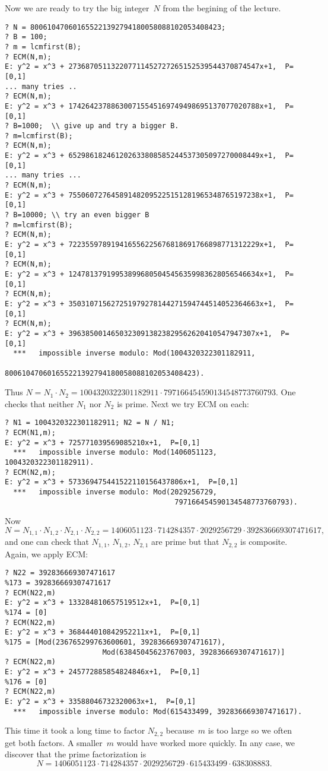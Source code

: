 \documentclass[11pt]{report}
\begin{document}
Now we are ready to try the big integer~$N$ from the begining of the lecture.
\begin{verbatim}
? N = 800610470601655221392794180058088102053408423;
? B = 100;
? m = lcmfirst(B);
? ECM(N,m);
E: y^2 = x^3 + 273687051132207711452727265152539544370874547x+1,  P=[0,1]
... many tries .. 
? ECM(N,m);
E: y^2 = x^3 + 174264237886300715545169749498695137077020788x+1,  P=[0,1]
? B=1000;  \\ give up and try a bigger B.
? m=lcmfirst(B);
? ECM(N,m);
E: y^2 = x^3 + 652986182461202633808585244537305097270008449x+1,  P=[0,1]
... many tries ...
? ECM(N,m);
E: y^2 = x^3 + 755060727645891482095225151281965348765197238x+1,  P=[0,1]
? B=10000; \\ try an even bigger B
? m=lcmfirst(B);
? ECM(N,m);
E: y^2 = x^3 + 722355978919416556225676818691766898771312229x+1,  P=[0,1]
? ECM(N,m);
E: y^2 = x^3 + 124781379199538996805045456359983628056546634x+1,  P=[0,1]
? ECM(N,m);
E: y^2 = x^3 + 350310715627251979278144271594744514052364663x+1,  P=[0,1]
? ECM(N,m);
E: y^2 = x^3 + 39638500146503230913823829562620410547947307x+1,  P=[0,1]
  ***   impossible inverse modulo: Mod(1004320322301182911, 
                            800610470601655221392794180058088102053408423).
\end{verbatim}
Thus
$
  N = N_1 \cdot N_2 = 1004320322301182911 \cdot 797166454590134548773760793.
$
One checks that neither $N_1$ nor $N_2$ is prime.  Next we try ECM on each:
\begin{verbatim}
? N1 = 1004320322301182911; N2 = N / N1;
? ECM(N1,m);
E: y^2 = x^3 + 725771039569085210x+1,  P=[0,1]
  ***   impossible inverse modulo: Mod(1406051123, 1004320322301182911).
? ECM(N2,m);
E: y^2 = x^3 + 573369475441522110156437806x+1,  P=[0,1]
  ***   impossible inverse modulo: Mod(2029256729, 
                                        797166454590134548773760793).
\end{verbatim}
Now
$$N = N_{1,1}\cdot N_{1,2} \cdot N_{2,1} \cdot N_{2,2}
  = 1406051123\cdot 714284357 \cdot 2029256729 \cdot  392836669307471617,$$
and one can check that $N_{1,1}$, $N_{1,2}$, $N_{2,1}$ are
prime but that $N_{2,2}$ is composite.  Again, we apply ECM:
\begin{verbatim}
? N22 = 392836669307471617
%173 = 392836669307471617
? ECM(N22,m)
E: y^2 = x^3 + 133284810657519512x+1,  P=[0,1]
%174 = [0]
? ECM(N22,m)
E: y^2 = x^3 + 368444010842952211x+1,  P=[0,1]
%175 = [Mod(236765299763600601, 392836669307471617), 
                       Mod(63845045623767003, 392836669307471617)]
? ECM(N22,m)
E: y^2 = x^3 + 245772885854824846x+1,  P=[0,1]
%176 = [0]
? ECM(N22,m)
E: y^2 = x^3 + 33588046732320063x+1,  P=[0,1]
  ***   impossible inverse modulo: Mod(615433499, 392836669307471617).
\end{verbatim}
This time it took a long time to factor $N_{2,2}$ because~$m$
is too large so we often get both factors.   A smaller~$m$ would
have worked more quickly.
In any case, we discover that the prime factorization is
$$N = 1406051123\cdot 714284357 \cdot 2029256729 \cdot 615433499 \cdot 638308883.$$
\end{document}
